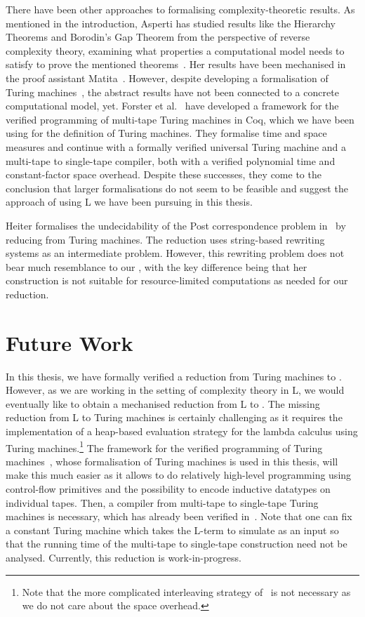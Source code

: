 There have been other approaches to formalising complexity-theoretic results. As mentioned in the introduction, Asperti has studied results like the Hierarchy Theorems and Borodin's Gap Theorem from the perspective of reverse complexity theory, examining what properties a computational model needs to satisfy to prove the mentioned theorems~\cite{asperti:reverse_complexity, asperti:borodin}. Her results have been mechanised in the proof assistant Matita~\cite{matita_web}. However, despite developing a formalisation of Turing machines~\cite{asperti_ricciotti}, the abstract results have not been connected to a concrete computational model, yet.
Forster et al.~\cite{ForsterEtAl:2019:VerifiedTMs} have developed a framework for the verified programming of multi-tape Turing machines in Coq, which we have been using for the definition of Turing machines. They formalise time and space measures and continue with a formally verified universal Turing machine and a multi-tape to single-tape compiler, both with a verified polynomial time and constant-factor space overhead. Despite these successes, they come to the conclusion that larger formalisations do not seem to be feasible and suggest the approach of using L we have been pursuing in this thesis.

Heiter formalises the undecidability of the Post correspondence problem in~\cite{heiter:pcp} by reducing from Turing machines. The reduction uses string-based rewriting systems as an intermediate problem. However, this rewriting problem does not bear much resemblance to our \PR{}, with the key difference being that her construction is not suitable for resource-limited computations as needed for our reduction.

\section{Future Work}
In this thesis, we have formally verified a reduction from Turing machines to \SAT{}. However, as we are working in the setting of complexity theory in L, we would eventually like to obtain a mechanised reduction from L to \SAT{}.
The missing reduction from L to Turing machines is certainly challenging as it requires the implementation of a heap-based evaluation strategy for the lambda calculus using Turing machines.\footnote{Note that the more complicated interleaving strategy of~\cite{ForsterKunzeRoth:2019:wcbv-Reasonable} is not necessary as we do not care about the space overhead.} The framework for the verified programming of Turing machines~\cite{ForsterEtAl:2019:VerifiedTMs}, whose formalisation of Turing machines is used in this thesis, will make this much easier as it allows to do relatively high-level programming using control-flow primitives and the possibility to encode inductive datatypes on individual tapes.
Then, a compiler from multi-tape to single-tape Turing machines is necessary, which has already been verified in~\cite{ForsterEtAl:2019:VerifiedTMs}. Note that one can fix a constant Turing machine which takes the L-term to simulate as an input so that the running time of the multi-tape to single-tape construction need not be analysed.
Currently, this reduction is work-in-progress.

